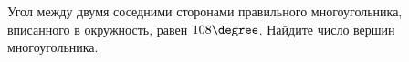 \begin{ex}
	\begin{condition}
		 Угол между двумя соседними сторонами правильного многоугольника, вписанного в окружность, равен \( 108\degree \). Найдите число вершин многоугольника.
	\end{condition}
\end{ex}